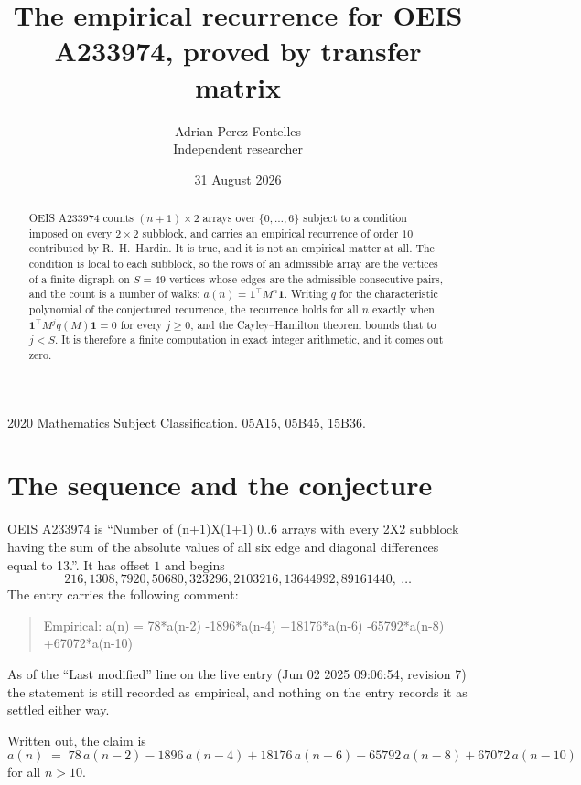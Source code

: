 \documentclass[11pt,a4paper]{article}
\title{The empirical recurrence for OEIS A233974, proved by transfer matrix}
\author{Adrian Perez Fontelles\\ \small Independent researcher}
\date{31 August 2026}
\theoremstyle{plain}
\theoremstyle{definition}
\begin{document}
\maketitle

\begin{abstract}
OEIS A233974 counts $(n+1)\times2$ arrays over $\{0,\dots,6\}$ subject to a condition imposed on
every $2\times2$ subblock, and carries an empirical recurrence of order $10$ contributed
by R.~H.~Hardin. It is true, and it is not an empirical matter at all. The condition is local
to each subblock, so the rows of an admissible array are the vertices of a finite digraph
on $S=49$ vertices whose edges are the admissible consecutive pairs, and the count is a
number of walks: $a(n)=\mathbf{1}^{\!\top}M^{n}\mathbf{1}$. Writing $q$
for the characteristic polynomial of the conjectured recurrence, the recurrence holds for all
$n$ exactly when $\mathbf{1}^{\!\top}M^{j}q(M)\mathbf{1}=0$ for every $j\ge0$, and the
Cayley--Hamilton theorem bounds that to $j<S$. It is therefore a finite computation in exact
integer arithmetic, and it comes out zero.
\end{abstract}

\noindent\small 2020 Mathematics Subject Classification. 05A15, 05B45, 15B36.\normalsize

\section{The sequence and the conjecture}

OEIS A233974 is ``Number of (n+1)X(1+1) 0..6 arrays with every 2X2 subblock having the sum of the absolute values of all six edge and diagonal differences equal to 13.''. It has offset $1$ and begins
\[
216, 1308, 7920, 50680, 323296, 2103216, 13644992, 89161440,\ \dots
\]
The entry carries the following comment:
\begin{quote}\small
Empirical: a(n) = 78*a(n-2) -1896*a(n-4) +18176*a(n-6) -65792*a(n-8) +67072*a(n-10)
\end{quote}
As of the ``Last modified'' line on the live entry (Jun 02 2025 09:06:54, revision 7) the statement is
still recorded as empirical, and nothing on the entry records it as settled either way.

Written out, the claim is
\begin{equation}\label{eq:conj}
a(n)\;=\;78\,a(n-2) - 1896\,a(n-4) + 18176\,a(n-6) - 65792\,a(n-8) + 67072\,a(n-10)
\end{equation}
for all $n>10$.
\end{document}
